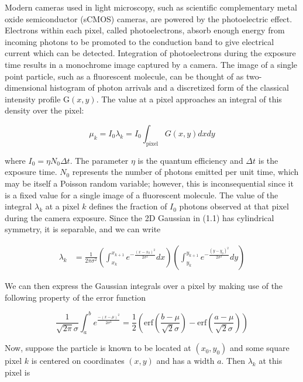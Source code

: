 \documentclass{ucetd}
\begin{document}
Modern cameras used in light microscopy, such as scientific complementary metal oxide semiconductor (sCMOS) cameras, are powered by the photoelectric effect. Electrons within each pixel, called photoelectrons, absorb enough energy from incoming photons to be promoted to the conduction band to give electrical current which can be detected. Integration of photoelectrons during the exposure time results in a monochrome image captured by a camera. The image of a single point particle, such as a fluorescent molecule, can be thought of as two-dimensional histogram of photon arrivals and a discretized form of the classical intensity profile $\mathrm{G}(x,y)$. The value at a pixel approaches an integral of this density over the pixel:

\begin{equation}
\mu_{k} = I_{0}\lambda_{k} = I_{0}\int_{\mathrm{pixel}} G(x,y)dxdy
\end{equation}

where $I_{0} = \eta N_{0}\Delta t$. The parameter $\eta$ is the quantum efficiency and $\Delta t$ is the exposure time. $N_{0}$ represents the number of photons emitted per unit time, which may be itself a Poisson random variable; however, this is inconsequential since it is a fixed value for a single image of a fluorescent molecule. The value of the integral $\lambda_{k}$ at a pixel $k$ defines the fraction of $I_{0}$ photons observed at that pixel during the camera exposure. Since the 2D Gaussian in (1.1) has cylindrical symmetry, it is separable, and we can write

\begin{align*}
\lambda_{k} &= \frac{1}{2\pi\sigma^{2}}\left(\int_{x_{k}}^{x_{k+1}}e^{-\frac{(x-x_{0})^{2}}{2\sigma^{2}}}dx\right)\left(\int_{y_{k}}^{y_{k+1}}e^{-\frac{(y-y_{0})^{2}}{2\sigma^{2}}}dy\right)
\end{align*}


We can then express the Gaussian integrals over a pixel by making use of the following property of the error function

\begin{equation*}
\frac{1}{\sqrt{2\pi}\sigma}\int_{a}^{b} e^{\frac{-(x-\mu)^{2}}{2\sigma^{2}}} = \frac{1}{2}\left(\mathrm{erf}\left(\frac{b-\mu}{\sqrt{2}\sigma}\right) -\mathrm{erf}\left(\frac{a-\mu}{\sqrt{2}\sigma}\right)\right)
\end{equation*}

Now, suppose the particle is known to be located at $(x_{0},y_{0})$ and some square pixel $k$ is centered on coordinates $(x,y)$ and has a width $a$. Then $\lambda_{k}$ at this pixel is
\end{document}
